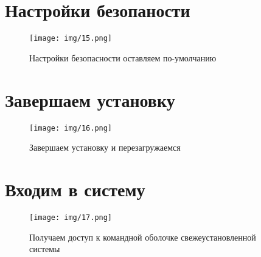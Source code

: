 \documentclass{gost}
\begin{document}
	\section{Настройки безопаности}
		\begin{figure}[H]
			\texttt{[image: img/15.png]}
			\caption{Настройки безопасности оставляем по-умолчанию}
		\end{figure}

	\section{Завершаем установку}
		\begin{figure}[H]
			\texttt{[image: img/16.png]}
			\caption{Завершаем установку и перезагружаемся}
		\end{figure}

	\section{Входим в систему}
		\begin{figure}[H]
			\texttt{[image: img/17.png]}
			\caption{Получаем доступ к командной оболочке свежеустановленной системы}
		\end{figure}
\end{document}
